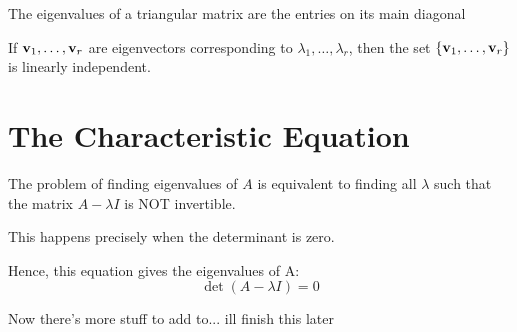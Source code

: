 \documentclass{report}
\begin{document}
\begin{theorem}
    The eigenvalues of a triangular matrix are the entries on its main diagonal
\end{theorem}

\begin{theorem}
    If $\mathbf{v}_1, \ldots, \mathbf{v}_r$ are eigenvectors corresponding to $\lambda_1, \ldots, \lambda_r$, 
    then the set $\{\mathbf{v}_1, \ldots, \mathbf{v}_r\}$ is linearly independent.
\end{theorem}

\section{The Characteristic Equation}

The problem of finding eigenvalues of $A$ is equivalent to finding all $\lambda$
such that the matrix $A - \lambda I$ is NOT invertible.

This happens precisely when the determinant is zero.

Hence, this equation gives the eigenvalues of A: \[\det (A - \lambda I) = 0\]

Now there's more stuff to add to... ill finish this later
\end{document}
